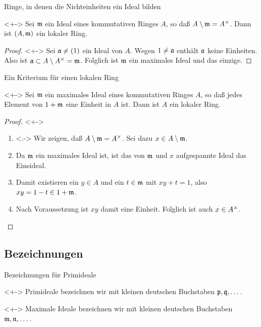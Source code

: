 \begin{frame}{Ringe, in denen die Nichteinheiten ein Ideal bilden}
    \begin{proposition}<+->
        Sei \(\mathfrak{m}\) ein Ideal eines kommutativen Ringes \(A\), so daß
        \(A \setminus \mathfrak{m} = A^\times\). Dann ist \((A, \mathfrak{m})\) ein
        lokaler Ring.
    \end{proposition}
    \begin{proof}<+->
        Sei \(\mathfrak{a} \neq (1)\) ein Ideal von \(A\). Wegen \(1 \neq \mathfrak{a}\)
        enthält \(\mathfrak{a}\) keine Einheiten. Also ist
        \(\mathfrak{a} \subset A \setminus A^\times = \mathfrak{m}\). Folglich
        ist \(\mathfrak{m}\) ein maximales Ideal und das einzige.
    \end{proof}
\end{frame}

\begin{frame}{Ein Kriterium für einen lokalen Ring}
    \begin{proposition}<+->
        Sei \(\mathfrak{m}\) ein maximales Ideal eines kommutativen Ringes \(A\),
        so daß jedes Element von \(1 + \mathfrak{m}\) eine Einheit in \(A\) ist.
        Dann ist \(A\) ein lokaler Ring.
    \end{proposition}
    \begin{proof}<+->
        \begin{enumerate}[<+->]
        \item<.->
            Wir zeigen, daß \(A \setminus \mathfrak{m} = A^\times\). Sei dazu
            \(x \in A \setminus \mathfrak{m}\).
        \item
            Da \(\mathfrak{m}\) ein maximales Ideal ist, ist das von \(\mathfrak{m}\)
            und \(x\) aufgespannte Ideal das Einsideal.
        \item
            Damit existieren ein \(y \in A\) und ein \(t \in \mathfrak{m}\) mit
            \(x y + t = 1\), also \(x y = 1 - t \in 1 + \mathfrak{m}\).
        \item
            Nach Voraussetzung ist \(x y\) damit eine Einheit. Folglich ist
            auch \(x \in A^\times\).
            \qedhere
        \end{enumerate}
    \end{proof}
\end{frame}

\subsection{Bezeichnungen}

\begin{frame}{Bezeichnungen für Primideale}
    \begin{convention}<+->
        Primideale bezeichnen wir mit kleinen deutschen Buchstaben
        \(\mathfrak{p}, \mathfrak{q}, \dotsc\).
    \end{convention}
    \begin{convention}<+->
        Maximale Ideale bezeichnen wir mit kleinen deutschen Buchstaben
        \(\mathfrak{m}, \mathfrak{n}, \dotsc\).
    \end{convention}    
\end{frame}

